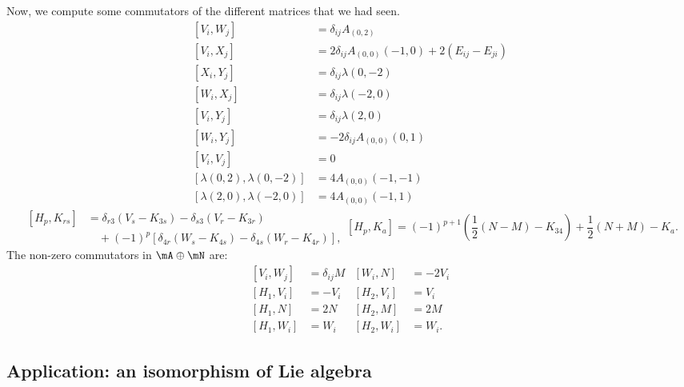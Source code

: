 Now, we compute some commutators of the different matrices that we had seen. 
\begin{subequations}
\begin{align}
[V_i,W_j]&=\delta_{ij}A_{(0,2)}\\
[V_i,X_j]&=2\delta_{ij}A_{(0,0)}(-1,0)+2(E_{ij}-E_{ji})\\
[X_i,Y_j]&=\delta_{ij}\lambda(0,-2)\\
[W_i,X_j]&=\delta_{ij}\lambda(-2,0)\\
[V_i,Y_j]&=\delta_{ij}\lambda(2,0)\\
[W_i,Y_j]&=-2\delta_{ij}A_{(0,0)}(0,1)\\
[V_i,V_j]&=0\\
[\lambda(0,2),\lambda(0,-2)]&=4A_{(0,0)}(-1,-1)\\
[\lambda(2,0),\lambda(-2,0)]&=4A_{(0,0)}(-1,1)
\end{align}
\end{subequations}
\begin{subequations}
\begin{equation}
\begin{split}
         [H_p,K_{rs}]&=\delta_{r3}(V_s-K_{3s})-\delta_{s3}(V_r-K_{3r})\\
 	             &\quad+(-1)^p[\delta_{4r}(W_s-K_{4s})-\delta_{4s}(W_r-K_{4r})],
\end{split}
\end{equation}
\begin{equation}
         [H_p,K_a]=(-1)^{p+1}(\frac{1}{2}(N-M)-K_{34})+\frac{1}{2}(N+M)-K_a.
\end{equation}
\end{subequations}
The non-zero commutators in $\mA\oplus\mN$ are:
\begin{subequations}		\label{TabelPrem}
\begin{align}
[V_i,W_j]&=\delta_{ij}M &[W_i,N]&=-2V_i\\
[H_1,V_i]&=-V_i          &[H_2,V_i]&=V_i\\
[H_1,N]&=2N          &[H_2,M]&=2M\\
[H_1,W_i]&=W_i   &[H_2,W_i]&=W_i.
\end{align}
\end{subequations}

					\subsection{Application: an isomorphism of Lie algebra}
\label{sssIsomsoslplussl}

